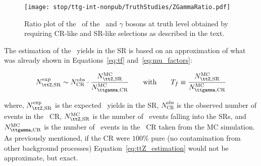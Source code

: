 		\begin{figure}[htpb]
		  \centering
		  \texttt{[image: stop/ttg-int-nonpub/TruthStudies/ZGammaRatio.pdf]}
		  \caption{Ratio plot of the \pt\ of the \Zboson\ and $\gamma$ bosons at truth level obtained by requiring \ac{CR}-like and \ac{SR}-like selections as described in the text.}
		  \label{fig:ZGammaratio}
		\end{figure}

		The estimation of the \ttZ\ yields in the \ac{SR} is based on an approximation of what was already shown in Equations~\ref{eq:tf} and~\ref{eq:mu_factors}:
		
		\begin{equation}
			N_{\ttZ,\mathrm{SR}}^{\mathrm{exp}} \sim N_{\mathrm{CR}}^{\mathrm{obs}} \cdot \frac{N_{\ttZ,\mathrm{SR}}^{\mathrm{MC}}}{N_{\ttgamma,\mathrm{CR}}^{\mathrm{MC}}} \qquad \mathrm{with} \qquad T_f \equiv \frac{N_{\ttZ,\mathrm{SR}}^{\mathrm{MC}}}{N_{\ttgamma,\mathrm{CR}}^{\mathrm{MC}}}
		\label{eq:ttZ_estimation}
		\end{equation}

		\noindent where, $N_{\ttZ,\mathrm{SR}}^{\mathrm{exp}}$ is the expected \ttZ\ yields in the \ac{SR}, $N_{\mathrm{CR}}^{\mathrm{obs}}$ is the observed number of events in the \ttgamma\ \ac{CR}, $N_{\ttZ,\mathrm{SR}}^{\mathrm{MC}}$ is the number of \ttZ\ events falling into the \acp{SR}, and $N_{\ttgamma,\mathrm{CR}}^{\mathrm{MC}}$ is the number of \ttgamma\ events in the \ttgamma\ \ac{CR} taken from the \ac{MC} simulation. As previously mentioned, if the \ac{CR} were $100\%$ pure (no contamination from other background processes) Equation~\ref{eq:ttZ_estimation} would not be approximate, but exact.

